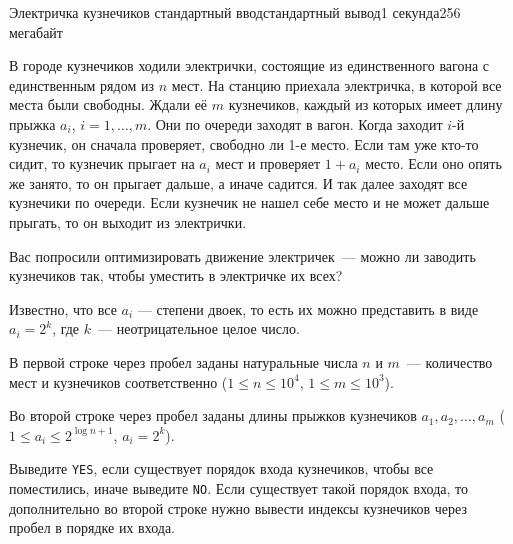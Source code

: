 \begin{problem}[(Зыков Т.\,А.)]{Электричка кузнечиков }{стандартный ввод}{стандартный вывод}{1 секунда}{256 мегабайт}

В городе кузнечиков ходили электрички, состоящие из единственного вагона с единственным рядом из $n$ мест. На станцию приехала электричка, в которой все места были свободны. Ждали её $m$ кузнечиков, каждый из которых имеет длину прыжка $a_{i}$, $i=1, \dots, m$. Они по очереди заходят в вагон. Когда заходит $i$-й кузнечик, он сначала проверяет, свободно ли 1-е место. Если там уже кто-то сидит, то кузнечик прыгает на $a_{i}$ мест и проверяет $1 + a_{i}$ место. Если оно опять же занято, то он прыгает дальше, а иначе садится. И так далее заходят все кузнечики по очереди. Если кузнечик не нашел себе место и не может дальше прыгать, то он выходит из электрички. 

Вас попросили оптимизировать движение электричек~--- можно ли заводить кузнечиков так, чтобы уместить в электричке их всех? 

Известно, что все $a_{i}$ --- степени двоек, то есть их можно представить в виде $a_{i} = 2^k$, где $k$~--- неотрицательное целое число.

\InputFile
В первой строке через пробел заданы натуральные числа $n$ и $m$~--- количество мест и кузнечиков соответственно ($1 \leq n \leq 10^4$, $1 \leq m \leq 10^3$).

Во второй строке через пробел заданы длины прыжков кузнечиков $a_{1}, a_{2}, \ldots, a_{m}$ ($1 \leq a_{i} \leq 2^{\log{n} + 1}$, $a_{i} = 2^k$).


\OutputFile
Выведите {\tt YES}, если существует порядок входа кузнечиков, чтобы все поместились, иначе выведите {\tt NO}.
Если существует такой порядок входа, то дополнительно во второй строке нужно вывести индексы кузнечиков через пробел в порядке их входа.

\Examples

\begin{example}
%
%
\end{example}

\end{problem}

